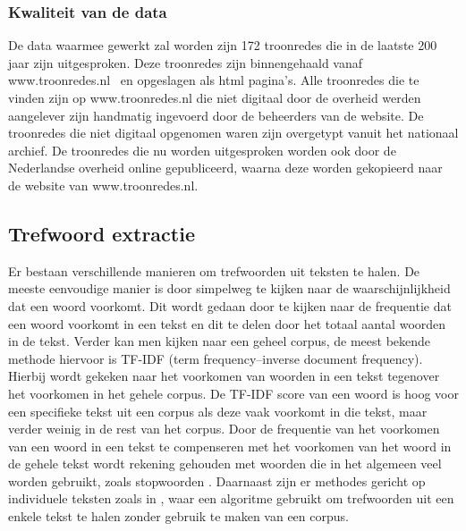 \subsubsection{Kwaliteit van de data}
De data waarmee gewerkt zal worden zijn 172 troonredes die in de laatste 200 jaar zijn uitgesproken. Deze troonredes zijn binnengehaald vanaf www.troonredes.nl~\citep{troonredes} en opgeslagen als html pagina's. Alle troonredes die te vinden zijn op www.troonredes.nl die niet digitaal door de overheid werden aangelever zijn handmatig ingevoerd door de beheerders van de website. De troonredes die niet digitaal opgenomen waren zijn overgetypt vanuit het nationaal archief. De troonredes die nu worden uitgesproken worden ook door de Nederlandse overheid online gepubliceerd, waarna deze worden gekopieerd naar de website van www.troonredes.nl.

\subsection{Trefwoord extractie}
Er bestaan verschillende manieren om trefwoorden uit teksten te halen. De meeste eenvoudige manier is door simpelweg te kijken naar de waarschijnlijkheid dat een woord voorkomt. Dit wordt gedaan door te kijken naar de frequentie dat een woord voorkomt in een tekst en dit te delen door het totaal aantal woorden in de tekst. Verder kan men kijken naar een geheel corpus, de meest bekende methode hiervoor is TF-IDF (term frequency–inverse document frequency)\citep{ramos2003using}. Hierbij wordt gekeken naar het voorkomen van woorden in een tekst tegenover het voorkomen in het gehele corpus. De TF-IDF score van een woord is hoog voor een specifieke tekst uit een corpus als deze vaak voorkomt in die tekst, maar verder weinig in de rest van het corpus. Door de frequentie van het voorkomen van een woord in een tekst te compenseren met het voorkomen van het woord in de gehele tekst wordt rekening gehouden met woorden die in het algemeen veel worden gebruikt, zoals stopwoorden \citep{aggarwal2012survey}. 
Daarnaast zijn er methodes gericht op individuele teksten zoals in \cite{matsuo2004keyword}, waar een algoritme gebruikt om trefwoorden uit een enkele tekst te halen zonder gebruik te maken van een corpus. 

